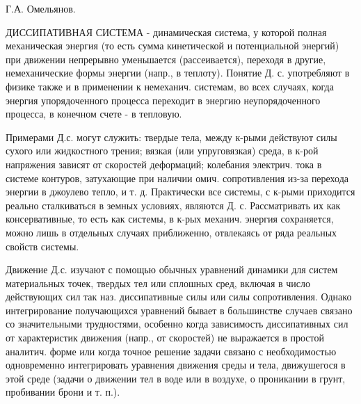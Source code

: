 \documentclass[10pt]{article}
\begin{document}
Г.А. Омельянов.



ДИССИПАТИВНАЯ СИСТЕМА - динамическая система, у которой полная механическая энергия (то есть сумма кинетической и потенциальной энергий) при движении непрерывно уменьшается (рассеивается), переходя в другие, немеханические формы энергии (напр., в теплоту). Понятие Д. с. употребляют в физике также и в применении к немеханич. системам, во всех случаях, когда энергия упорядоченного процесса переходит в энергию неупорядоченного процесса, в конечном счете - в тепловую.



Примерами Д.с. могут служить: твердые тела, между к-рыми действуют силы сухого или жидкостного трения; вязкая (или упруговязкая) среда, в к-рой напряжения зависят от скоростей деформаций; колебания электрич. тока в системе контуров, затухающие при наличии омич. сопротивления из-за перехода энергии в джоулево тепло, и т. д. Практически все системы, с к-рыми приходится реально сталкиваться в земных условиях, являются Д. с. Рассматривать их как консервативные, то есть как системы, в к-рых механич. энергия сохраняется, можно лишь в отдельных случаях приближенно, отвлекаясь от ряда реальных свойств системы.



Движение Д.с. изучают с помощью обычных уравнений динамики для систем материальных точек, твердых тел или сплошных сред, включая в число действующих сил так наз. диссипативные силы или силы сопротивления. Однако интегрирование получающихся уравнений бывает в большинстве случаев связано со значительными трудностями, особенно когда зависимость диссипативных сил от характеристик движения (напр., от скоростей) не выражается в простой аналитич. форме или когда точное решение задачи связано с необходимостью одновременно интегрировать уравнения движения среды и тела, движушегося в этой среде (задачи о движении тел в воде или в воздухе, о проникании в грунт, пробивании брони и т. п.).
\end{document}
